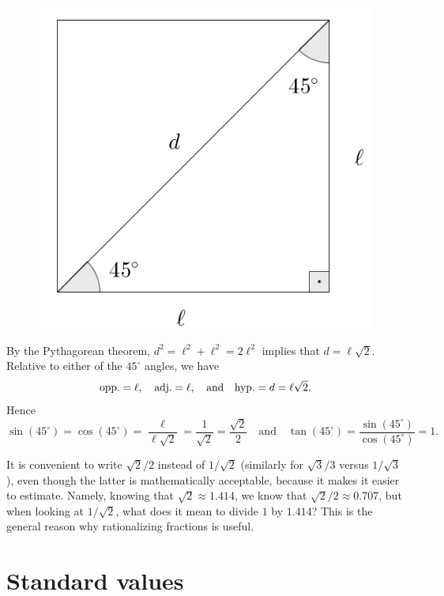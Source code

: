 \documentclass{ximera}
\begin{document}
\begin{figure}[h]
  \centering
  \includegraphics[scale=.3]{./figures/9-1-1-triangle-45.png}
\end{figure}

By the Pythagorean theorem, $d^2 = \ell^2+\ell^2 = 2\ell^2$ implies that $d=\ell\sqrt{2}$. Relative to either of the $45^\circ$ angles, we have $${\rm opp.} = \ell, \quad {\rm adj.} =\ell, \quad\mbox{and}\quad {\rm hyp.}=d=\ell\sqrt{2}.$$
Hence $$\sin(45^\circ) =\cos(45^\circ) =  \frac{\ell}{\ell\sqrt{2}} = \frac{1}{\sqrt{2}} = \frac{\sqrt{2}}{2} \quad\mbox{and}\quad \tan(45^\circ) = \frac{\sin(45^\circ)}{\cos(45^\circ)} = 1.$$

\begin{remark}
  It is convenient to write $\sqrt{2}/2$ instead of $1/\sqrt{2}$ (similarly for $\sqrt{3}/3$ versus $1/\sqrt{3}$), even though the latter is mathematically acceptable, because it makes it easier to estimate. Namely, knowing that $\sqrt{2} \approx 1.414$, we know that $\sqrt{2}/2 \approx 0.707$, but when looking at $1/\sqrt{2}$, what does it mean to divide $1$ by $1.414$? This is the general reason why rationalizing fractions is useful.
\end{remark}


\section{Standard values}
\end{document}
